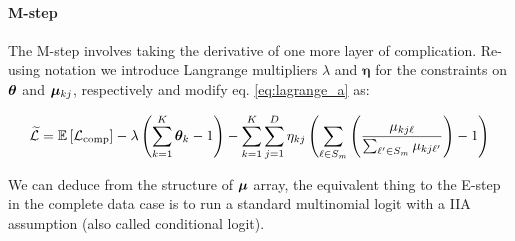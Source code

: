 \documentclass[11pt]{article}
\begin{document}
\paragraph{M-step}  The M-step involves taking the derivative of one more layer of complication. Re-using notation we introduce Langrange multipliers \(\lambda\) and \(\bm{\eta}\) for the constraints on \(\bm{\theta}\) and \(\bm{\mu}_{kj}\), respectively and modify eq. \ref{eq:lagrange_a} as:

\begin{align}
\widetilde{\mathcal{L}} = \mathbb{E}\left[\mathcal{L}_\text{comp}\right] - \lambda\left(\sum^{K}_{k=1}\bm{\theta}_k - 1\right) - \sum^{K}_{k=1}\sum^{D}_{j=1}\eta_{kj}\left(\sum_{\ell \in S_{m}}\left(\frac{\mu_{kj\ell}}{\sum_{\ell^\prime \in S_{m}} \mu_{kj\ell^\prime}}\right) - 1\right) \nonumber
\end{align}

We can deduce from the structure of \(\bm{\mu}\) array, the equivalent thing to the E-step in the complete data case is to run a standard multinomial logit with a IIA assumption (also called conditional logit).











\end{document}
